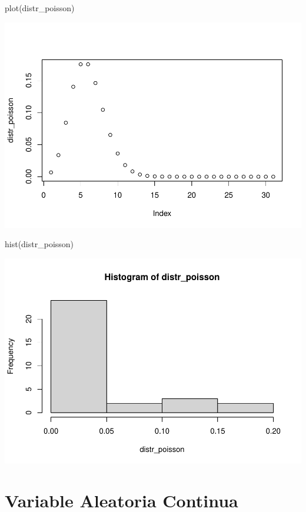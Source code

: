 \documentclass[
]{article}
\newenvironment{Shaded}{\begin{snugshade}}{\end{snugshade}}
\newcommand{\FunctionTok}[1]{\textcolor[rgb]{0.00,0.00,0.00}{#1}}
\newcommand{\NormalTok}[1]{#1}
\begin{document}
\begin{Shaded}
\begin{Highlighting}[]
\FunctionTok{plot}\NormalTok{(distr\_poisson)}
\end{Highlighting}
\end{Shaded}

\includegraphics{Teoria4_files/figure-latex/Ejemplo de Poisson-1.pdf}

\begin{Shaded}
\begin{Highlighting}[]
\FunctionTok{hist}\NormalTok{(distr\_poisson)}
\end{Highlighting}
\end{Shaded}

\includegraphics{Teoria4_files/figure-latex/Ejemplo de Poisson-2.pdf}

\hypertarget{variable-aleatoria-continua}{%
\section{Variable Aleatoria
Continua}\label{variable-aleatoria-continua}}
\end{document}
